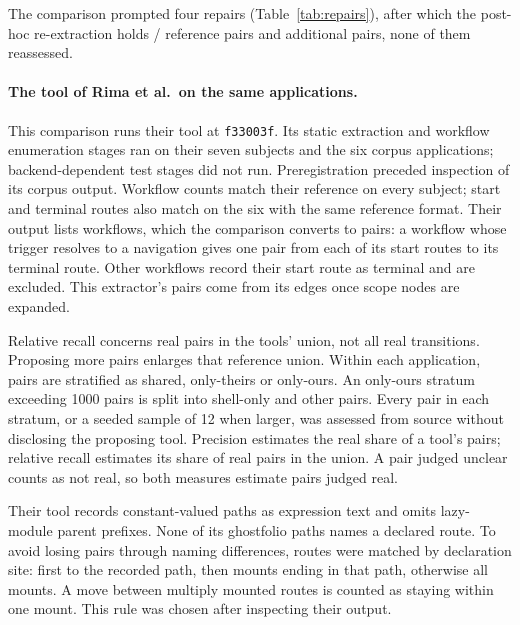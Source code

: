 The comparison prompted four repairs (Table~\ref{tab:repairs}), after which the post-hoc
re-extraction holds \RimaRepHitFull{}/\RimaPairs{} reference pairs and \RimaRepExtra{} additional
pairs, none of them reassessed.

\paragraph{The tool of Rima et al.\ on the same applications.}
\label{sec:res-h2h}

This comparison runs their tool at \texttt{f33003f}. Its static extraction and workflow enumeration
stages ran on their seven subjects and the six corpus applications; backend-dependent test stages
did not run. Preregistration preceded inspection of its corpus output. Workflow counts match their
reference on every subject; start and terminal routes also match on the six with the same reference
format. Their output lists workflows, which the comparison converts to pairs: a workflow whose trigger
resolves to a navigation gives one pair from each of its start routes to its terminal route. Other workflows record their start route
as terminal and are excluded. This extractor's pairs come from its edges once scope nodes are
expanded.

Relative recall concerns real pairs in the tools' union, not
all real transitions. Proposing more pairs enlarges that reference union. Within each application,
pairs are stratified as shared, only-theirs or only-ours. An only-ours stratum exceeding 1000 pairs
is split into shell-only and other pairs. Every pair in each stratum, or a seeded sample of 12 when
larger, was assessed from source without disclosing the proposing tool. Precision estimates the
real share of a tool's pairs; relative recall estimates its share of real pairs in the union. A pair
judged unclear counts as not real, so both measures estimate pairs judged real.

Their tool records constant-valued paths as expression text and omits lazy-module parent prefixes.
None of its \HHRoutesGhostfolioTheirs{} ghostfolio paths names a declared route. To avoid losing
pairs through naming differences, routes were matched by declaration site: first to the recorded
path, then mounts ending in that path, otherwise all mounts. A move between multiply mounted routes
is counted as staying within one mount. This rule was chosen after inspecting their output.

